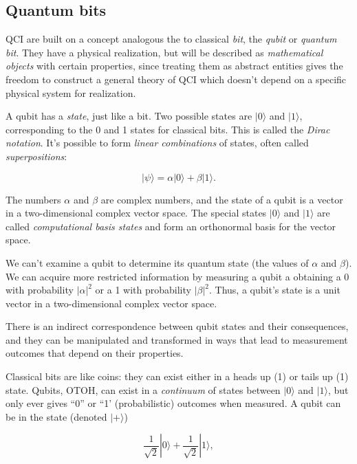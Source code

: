 \documentclass{article}
\newcommand{\bracket}[1]{|#1\rangle}
\begin{document}
\subsection{Quantum bits}

QCI are built on a concept analogous the to classical \textit{bit}, the \textit{qubit} or \textit{quantum bit}. They have a physical realization, but will be described as \textit{mathematical objects} with certain properties, since treating them as abstract entities gives the freedom to construct a general theory of QCI which doesn't depend on a specific physical system for realization.

A qubit has a \textit{state}, just like a bit. Two possible states are $\bracket{0}$ and $\bracket{1}$, corresponding to the 0 and 1 states for classical bits. This is called the \textit{Dirac notation}. It's possible to form \textit{linear combinations} of states, often called \textit{superpositions}:

\begin{equation} \label{eq:1}
\bracket{\psi} = \alpha \bracket{0} + \beta \bracket{1}.
\end{equation}

The numbers $\alpha$ and $\beta$ are complex numbers, and the state of a qubit is a vector in a two-dimensional complex vector space. The special states $\bracket{0}$ and $\bracket{1}$ are called \textit{computational basis states} and form an orthonormal basis for the vector space.

We can't examine a qubit to determine its quantum state (the values of $\alpha$ and $\beta$). We can acquire more restricted information by measuring a qubit a obtaining a 0 with probability $|\alpha|^2$ or a 1 with probability $|\beta|^2$. Thus, a qubit's state is a unit vector in a two-dimensional complex vector space.

There is an indirect correspondence between qubit states and their consequences, and they can be manipulated and transformed in ways that lead to measurement outcomes that depend on their properties.

Classical bits are like coins: they can exist either in a heads up (1) or tails up (1) state. Qubits, OTOH, can exist in a \textit{continuum} of states between $\bracket{0}$ and $\bracket{1}$, but only ever gives ``0'' or ``1' (probabilistic) outcomes when measured. A qubit can be in the state (denoted $\bracket{+}$)

\begin{equation} \label{eq:2}
\frac{1}{\sqrt{2}} \bracket{0} + \frac{1}{\sqrt{2}} \bracket{1},
\end{equation}
\end{document}
